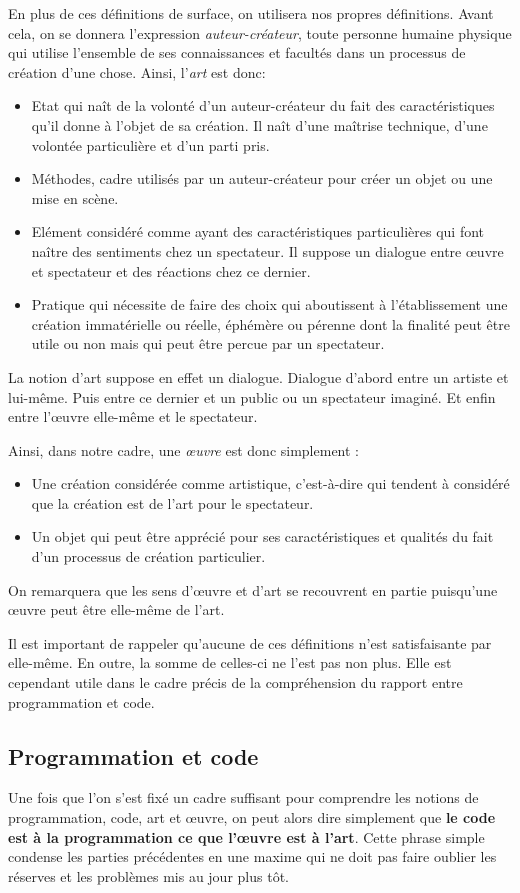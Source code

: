\documentclass[12pt]{article} %
\begin{document}
En plus de ces définitions de surface, on utilisera nos propres définitions. Avant cela, on se donnera l'expression \textit{auteur-créateur}, toute personne humaine physique qui utilise l'ensemble de ses connaissances et facultés dans un processus de création d'une chose. Ainsi, l'\textit{art} est donc:
\begin{itemize}
    \item Etat qui naît de la volonté d'un auteur-créateur du fait des caractéristiques qu'il donne à l'objet de sa création. Il naît d'une maîtrise technique, d'une volontée particulière et d'un parti pris.
    \item Méthodes, cadre utilisés par un auteur-créateur pour créer un objet ou une mise en scène.
    \item Elément considéré comme ayant des caractéristiques particulières qui font naître des sentiments chez un spectateur. Il suppose un dialogue entre œuvre et spectateur et des réactions chez ce dernier.
    \item Pratique qui nécessite de faire des choix qui aboutissent à l'établissement une création immatérielle ou réelle, éphémère ou pérenne dont la finalité peut être utile ou non mais qui peut être percue par un spectateur.
\end{itemize}
La notion d'art suppose en effet un dialogue. Dialogue d'abord entre un artiste et lui-même. Puis entre ce dernier et un public ou un spectateur imaginé. Et enfin entre l'œuvre elle-même et le spectateur. 

Ainsi, dans notre cadre, une \textit{œuvre} est donc simplement :
\begin{itemize}
    \item Une création considérée comme artistique, c'est-à-dire qui tendent à considéré que la création est de l'art pour le spectateur.
    \item Un objet qui peut être apprécié pour ses caractéristiques et qualités du fait d'un processus de création particulier.
\end{itemize}
On remarquera que les sens d'œuvre et d'art se recouvrent en partie puisqu'une œuvre peut être elle-même de l'art.

Il est important de rappeler qu'aucune de ces définitions n'est satisfaisante par elle-même. En outre, la somme de celles-ci ne l'est pas non plus. Elle est cependant utile dans le cadre précis de la compréhension du rapport entre programmation et code.

\subsection{Programmation et code} %
Une fois que l'on s'est fixé un cadre suffisant pour comprendre les notions de programmation, code, art et œuvre, on peut alors dire simplement que \textbf{le code est à la programmation ce que l'œuvre est à l'art}. Cette phrase simple condense les parties précédentes en une maxime qui ne doit pas faire oublier les réserves et les problèmes mis au jour plus tôt.
\end{document}
